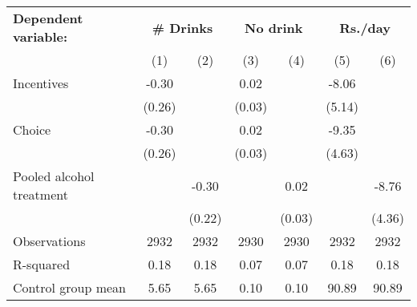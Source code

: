 \begin{tabular}{l c c c c c c} \toprule \textbf{Dependent variable:} & \multicolumn{2}{c}{\textbf{\# Drinks}} & \multicolumn{2}{c}{\textbf{No drink}} & \multicolumn{2}{c}{\textbf{Rs./day}} \\ \cmidrule(lr){2-3} \cmidrule(lr){4-5} \cmidrule(lr){6-7}&\multicolumn{1}{c}{(1)}&\multicolumn{1}{c}{(2)}&\multicolumn{1}{c}{(3)}&\multicolumn{1}{c}{(4)}&\multicolumn{1}{c}{(5)}&\multicolumn{1}{c}{(6)}\\
\midrule
Incentives          &       -0.30&            &        0.02&            &       -8.06&            \\
                    &      (0.26)&            &      (0.03)&            &      (5.14)&            \\
\addlinespace
Choice              &       -0.30&            &        0.02&            &       -9.35&            \\
                    &      (0.26)&            &      (0.03)&            &      (4.63)&            \\
\addlinespace
Pooled alcohol treatment&            &       -0.30&            &        0.02&            &       -8.76\\
                    &            &      (0.22)&            &      (0.03)&            &      (4.36)\\
\midrule
Observations        &        2932&        2932&        2930&        2930&        2932&        2932\\
R-squared           &        0.18&        0.18&        0.07&        0.07&        0.18&        0.18\\
Control group mean  &        5.65&        5.65&        0.10&        0.10&       90.89&       90.89\\
\bottomrule \end{tabular} 